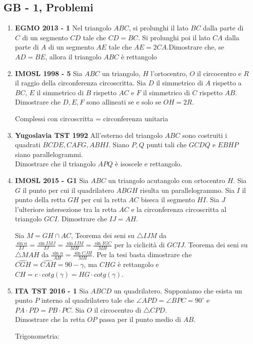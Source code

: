 \subsection{GB - 1, Problemi}
\begin{enumerate}
 \item \textbf{EGMO 2013 - 1} Nel triangolo $ABC$, si prolunghi il lato $BC$ dalla parte di $C$ di un segmento $CD$ tale che $CD=BC$. Si prolunghi poi il lato $CA$ dalla parte di $A$ di un segmento $AE$ tale che $AE= 2CA$.Dimostrare che, se $AD=BE$, allora il triangolo $ABC$ è rettangolo
 
 \item \textbf{IMOSL 1998 - 5} Sia $ABC$ un triangolo, $H$ l'ortocentro, $O$ il circocentro e $R$ il raggio della circonferenza circoscritta. Sia $D$ il simmetrico di $A$ rispetto a $BC$, $E$ il simmetrico di $B$ rispetto $AC$ e $F$ il simmetrico di $C$ rispetto $AB$.\\
 Dimostrare che $D,E,F$ sono allineati se e solo se $OH=2R$.

 \begin{sol}
 Complessi con circoscritta = circonferenza unitaria
\end{sol}

\item \textbf{Yugoslavia TST 1992} All'esterno del triangolo $ABC$ sono costruiti i quadrati $BCDE,CAFG,ABHI$. Siano $P,Q$ punti tali che $GCDQ$ e $EBHP$ siano parallelogrammi.\\
Dimostrare che il triangolo $APQ$ è isoscele e rettangolo.

 
 
 \item \textbf{IMOSL 2015 - G1} Sia $ABC$ un triangolo acutangolo con ortocentro $H$. Sia $G$ il punto per cui il quadrilatero $ABGH$ risulta un parallelogrammo. Sia $I$ il punto della retta $GH$ per cui
la retta $AC$ biseca il segmento $HI$. Sia $J$ l’ulteriore intersezione tra la retta $AC$ e la
circonferenza circoscritta al triangolo $GCI$.
Dimostrare che $IJ = AH$.

\begin{sol}
 Sia $M=GH\cap AC$, Teorema dei seni su $\triangle IJM$ da $\frac{\sin\alpha}{IJ}=\frac{\sin IMJ}{IJ}=\frac{\sin IJM}{MH}=\frac{\sin IGC}{MH}$ per la ciclicità di $GCIJ$. Teorema dei seni su $\triangle MAH$ da $\frac{\sin\alpha}{AH}=\frac{\sin CJH}{MH}$. Per la tesi basta dimostrare che $\widehat{CGH}=\widehat{CAH}=90-\gamma$, ma $CHG$ è rettangolo e $CH=c\cdot cotg(\gamma)=HG\cdot cotg(\gamma)$.
\end{sol}

\item \textbf{ITA TST 2016 - 1} Sia $ABCD$ un quadrilatero. Supponiamo che esista un punto $P$ interno al quadrilatero tale che $\angle APD = \angle BPC = 90^{\circ}$ e $PA \cdot PD = PB \cdot PC$. Sia $O$ il circocentro di $\triangle CPD$.\\
Dimostrare che la retta $OP$ passa per il punto medio di $AB$.

\begin{sol}
Trigonometria: 
\end{sol}
 
 
 
 \end{enumerate}



